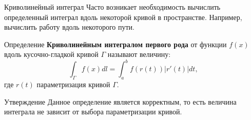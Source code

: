 \documentclass[8pt]{beamer}
\begin{document}
\begin{frame}{Криволинейный интеграл}
Часто возникает необходимость вычислить определенный интеграл вдоль некоторой кривой в пространстве. Например, вычислить работу вдоль некоторого пути.
\begin{block}{Определение}
{\bf Криволинейным интегралом первого рода} от функции $f(x)$ вдоль кусочно-гладкой кривой $\Gamma$ называют величину:
$$\int_\Gamma f(x)dl = \int_a^b f(r(t))|r'(t)|dt,$$
где $r(t)$ параметризация кривой $\Gamma$.
\end{block}
\begin{block}{Утверждение}
Данное определение является корректным, то есть величина интеграла не зависит от выбора параметризации кривой.
\end{block}
\end{frame}
\end{document}
